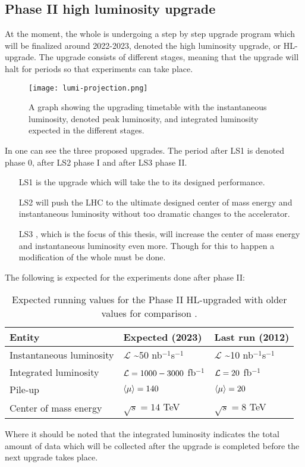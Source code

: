 \subsection{Phase II high luminosity upgrade}\label{sec:eo:subsec:hlu}
At the moment, the whole \abbrLHC is undergoing a step by step upgrade program which will be finalized around 2022-2023, denoted the high luminosity upgrade, or HL-upgrade. The upgrade consists of different stages, meaning that the upgrade will halt for periods so that experiments can take place. 
\begin{figure}[ht]
\texttt{[image: lumi-projection.png]}
\caption{A graph showing the upgrading timetable with the instantaneous luminosity, denoted peak luminosity, and integrated luminosity expected in the different stages.}
\label{fig:upgt}
\end{figure}
In  one can see the three proposed upgrades. The period after LS1 is denoted phase 0, after LS2 phase I and after LS3 phase II. 
\begin{itemize}
\item[LS1] is the upgrade which will take the \abbrLHC to its designed performance. 

\item[LS2] will push the LHC to the ultimate designed center of mass energy and instantaneous luminosity without too dramatic changes to the accelerator. 
\item[LS3], which is the focus of this thesis, will increase the center of mass energy and instantaneous luminosity even more. Though for this to happen a modification of the whole \abbrLHC must be done.
\end{itemize}
The following is expected for the experiments done after phase II:
\renewcommand{\arraystretch}{1.5} %
\begin{table}[H]
\begin{center}
    \begin{tabular}{ | l | l | l |}
    \hline
    Entity & Expected (2023) & Last run (2012) \\ \hline
    Instantaneous luminosity & $\mathscr{L}$ \textasciitilde 50 nb$^{-1}$s$^{-1}$ & $\mathscr{L}$ \textasciitilde 10 nb$^{-1}$s$^{-1}$ \\ \hline  
    Integrated luminosity & $\mathcal{L}=1000-3000$ fb$^{-1}$ & $\mathcal{L}=20$ fb$^{-1}$ \\ \hline
  	Pile-up & $\left<\mu\right>=140$ & $\left<\mu\right>=20$ \\ \hline
  	Center of mass energy & $\sqrt{s}=14$ TeV &  $\sqrt{s}=8$ TeV \\ \hline
  	\end{tabular}
  	
  	\caption{Expected running values for the Phase II HL-upgraded \abbrLHC with older values for comparison \citep{HL:2013}.}
  	\label{tab:expectvalues}
  	\end{center}
    \end{table}
    \renewcommand{\arraystretch}{1.0}  %
Where it should be noted that the integrated luminosity indicates the total amount of data which will be collected after the upgrade is completed before the next upgrade takes place. 

